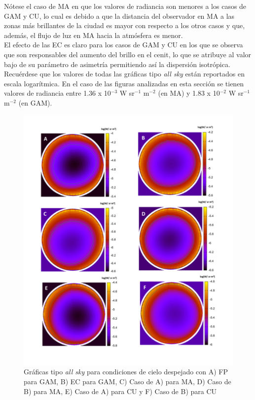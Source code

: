 Nótese el caso de MA en que los valores de radiancia son menores a los casos de GAM y CU, lo cual es debido a que la distancia del observador en MA a las zonas más brillantes de la ciudad es mayor con respecto a los otros casos y que, además, el flujo de luz en MA hacia la atmósfera es menor.\\

El efecto de las EC es claro para los casos de GAM y CU en los que se observa que son responsables del aumento del brillo en el cenit, lo que se atribuye al valor bajo de su parámetro de asimetría permitiendo así la dispersión isotrópica.\\

Recuérdese que los valores de todas las gráficas tipo \textit{all sky} están reportados en escala logarítmica. En el caso de las figuras analizadas en esta sección se tienen valores de radiancia entre 1.36 x 10$^{-3}$ W sr$^{-1}$ m$^{-2}$ (en MA) y 1.83 x 10$^{-2}$ W sr$^{-1}$ m$^{-2}$ (en GAM).\\

\newpage

\begin{figure}[H]
  \centering
    \includegraphics[width=1\textwidth]{1}
  \caption{Gráficas tipo \textit{all sky} para condiciones de cielo despejado con A) FP para GAM, B) EC para GAM, C) Caso de A) para MA, D) Caso de B) para MA, E) Caso de A) para CU y F) Caso de B) para CU} 
  \label{1}
\end{figure}



